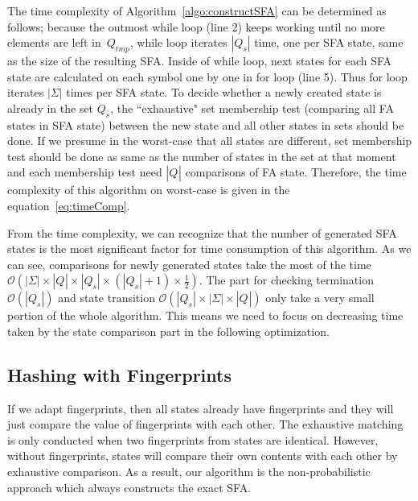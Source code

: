 \documentclass[10pt, conference, compsocconf]{IEEEtran}
\newcommand\StateSet[1][{}]{\ensuremath{Q_{#1}}}
\begin{document}
The time complexity of Algorithm~\ref{algo:constructSFA} can be determined
as follows; because the outmost while loop (line 2) keeps working until
no more elements are left in~$\StateSet[tmp]$,
while loop
iterates $|\StateSet[s]|$ time, one per SFA state, same as the size
of the resulting SFA. Inside of while loop, next states for each
SFA state are calculated on each symbol one by one in for loop (line 5). Thus
for loop iterates $|\Sigma|$ times per SFA state. To decide
whether a newly created state is already in the set $\StateSet[s]$,
the ``exhaustive" set membership test (comparing all FA states in SFA state)
between the new state
and all other states in sets
should be done. If we presume in the worst-case that all states are different,
set membership test should be done as same as the number of
states in the set at that moment and each membership test need
$|\StateSet|$ comparisons of FA state. Therefore, the time complexity of
this algorithm on worst-case is given in the equation~\eqref{eq:timeComp}.

From the time complexity, we can recognize that the number of generated
SFA states is the most significant factor for time consumption
of this algorithm. As we can see,
comparisons for newly generated states take the
most of
the time $\mathcal{O}(|\Sigma|\times |\StateSet|\times|\StateSet[s]|\times
(|\StateSet[s]|+1)\times \frac{1}{2})$. The part for checking termination
$\mathcal{O}(|\StateSet[s]|)$ and state transition $\mathcal{O}(|\StateSet[s]|
\times|\Sigma|\times|\StateSet|)$ only take a very small portion of the whole algorithm. This
means we need to focus on decreasing time taken by the state comparison
part in the following optimization.

\subsection{Hashing with Fingerprints}
\iffalse
\begin{figure}[htp]
\centering
\texttt{[image: figures/Before\_hashing]}
\caption{Exhaustive comparison}
\label{fig:exComp}
\end{figure}

Figure~\ref{fig:exComp} shows how the exhaustive comparison works
in the baseline Algorithm~\ref{algo:constructSFA}. In the figure, SFA state
$D_1, D_2,$ and $D_3$ is already in the set so that they are pointed out by
pointer array. When the $D_4$ is created, it traverses the pointer array
from index 0 to the end until it finds an empty space. While traversing,
it compares its equivalence with other states already in the set one by one.
\fi
If we adapt fingerprints, then all states already have fingerprints and they will just compare the value of fingerprints with each other. The exhaustive matching is only conducted when two fingerprints from states are identical.
However, without fingerprints, states will compare their own contents with each other by exhaustive comparison.
As a result, our algorithm is the non-probabilistic approach which always constructs 
the exact SFA.
\end{document}
